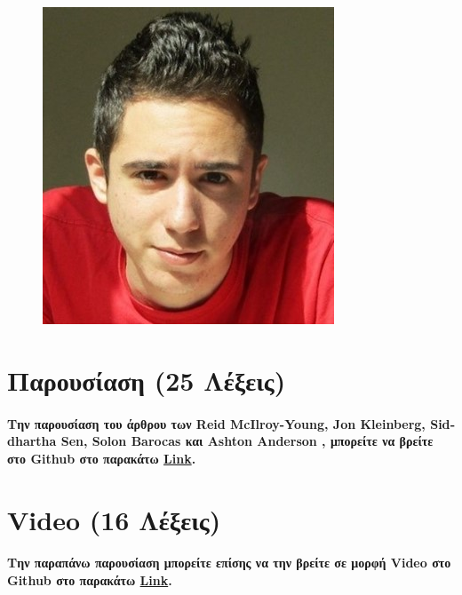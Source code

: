\documentclass[12pt, A4]{article}
\newcommand{\tl}{\textlatin}
\begin{document}
    \begin{figure}
	\includegraphics[width=\linewidth]{Bio/bio2.jpg}
    \end{figure}
    
    \newpage
    \section{Παρουσίαση (25 Λέξεις)}
    \paragraph{Την παρουσίαση του άρθρου των \tl{Reid McIlroy-Young, Jon Kleinberg, Siddhartha Sen, Solon Barocas} και \tl{Ashton Anderson} \cite{article3}, μπορείτε να βρείτε στο \tl{Github} στο παρακάτω \href{https://github.com/CallMeJasonYT/Ethics-Project/blob/main/Angoura_Pavlopoulos_Ethics.pptx}{\tl{Link}}.}
    
    \section{\tl{Video} (16 Λέξεις)}
    \paragraph{Την παραπάνω παρουσίαση μπορείτε επίσης να την βρείτε σε μορφή \tl{Video} στο \tl{Github} στο παρακάτω \href{https://github.com/CallMeJasonYT/Ethics-Project/blob/main/Angoura_Pavlopoulos_Ethics.mp4}{\tl{Link}}.}
    
\end{document}
